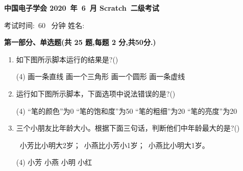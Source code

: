 \documentclass[10pt, a4paper]{article}
\newcommand{\Title}[3]{
    \begin{center}
        \Large \textbf{中国电子学会 #1~年~#2~月 Scratch~#3级考试}
    \end{center}
}
\newcommand{\TimeAndName}[1]{
    \begin{center}
        考试时间:~#1~ 分钟 \qquad\qquad\qquad\qquad 姓名:\underline{\quad\quad\quad\quad}
    \end{center}
}
\begin{document}
    \Title{2020}{6}{二} %
    \TimeAndName{60} %

    \vspace{2mm}
    {\noindent\textbf{第一部分、单选题(共 25 题,每题 2 分,共50分.)}}
    \begin{enumerate}
        \item 如下图所示脚本运行的结果是?(\qquad)
        \begin{tasks}(4)
            \task 画一条直线
            \task 画一个三角形
            \task 画一个圆形
            \task 画一条虚线
        \end{tasks}

        \item 运行如下图所示脚本，下面选项中说法错误的是?(\qquad)
        \begin{tasks}(4)
            \task “笔的颜色”为0
            \task “笔的饱和度”为50
            \task “笔的粗细”为20
            \task “笔的亮度”为20
        \end{tasks}

        \item 三个小朋友比年龄大小。根据下面三句话，判断他们中年龄最大的是?(\qquad)
        
        ~小芳比小明大2岁；\quad {}~小燕比小芳小1岁；\quad {}~小燕比小明大1岁。
        \begin{tasks}(4)
            \task 小芳
            \task 小燕
            \task 小明
            \task 小红
        \end{tasks}


\end{enumerate}
\end{document}
